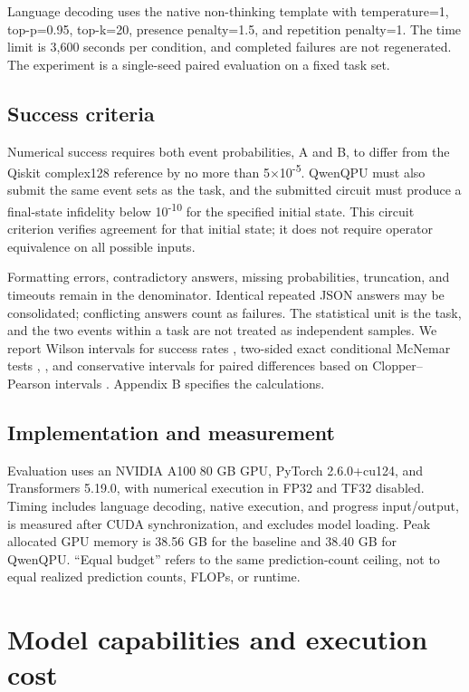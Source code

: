 \documentclass[11pt,a4paper]{article}
\begin{document}
Language decoding uses the native non-thinking template with temperature=1, top-p=0.95, top-k=20, presence penalty=1.5, and repetition penalty=1. The time limit is 3,600 seconds per condition, and completed failures are not regenerated. The experiment is a single-seed paired evaluation on a fixed task set.

\subsection{Success criteria}

Numerical success requires both event probabilities, A and B, to differ from the Qiskit complex128 reference by no more than 5\ensuremath{\times}10\textsuperscript{-5}. QwenQPU must also submit the same event sets as the task, and the submitted circuit must produce a final-state infidelity below 10\textsuperscript{-10} for the specified initial state. This circuit criterion verifies agreement for that initial state; it does not require operator equivalence on all possible inputs.

Formatting errors, contradictory answers, missing probabilities, truncation, and timeouts remain in the denominator. Identical repeated JSON answers may be consolidated; conflicting answers count as failures. The statistical unit is the task, and the two events within a task are not treated as independent samples. We report Wilson intervals for success rates \cite{ref27}, two-sided exact conditional McNemar tests \cite{ref28}, \cite{ref29}, and conservative intervals for paired differences based on Clopper--Pearson intervals \cite{ref30}. Appendix B specifies the calculations.

\subsection{Implementation and measurement}

Evaluation uses an NVIDIA A100 80 GB GPU, PyTorch 2.6.0+cu124, and Transformers 5.19.0, with numerical execution in FP32 and TF32 disabled. Timing includes language decoding, native execution, and progress input/output, is measured after CUDA synchronization, and excludes model loading. Peak allocated GPU memory is 38.56 GB for the baseline and 38.40 GB for QwenQPU. ``Equal budget'' refers to the same prediction-count ceiling, not to equal realized prediction counts, FLOPs, or runtime.

\section{Model capabilities and execution cost}
\end{document}
